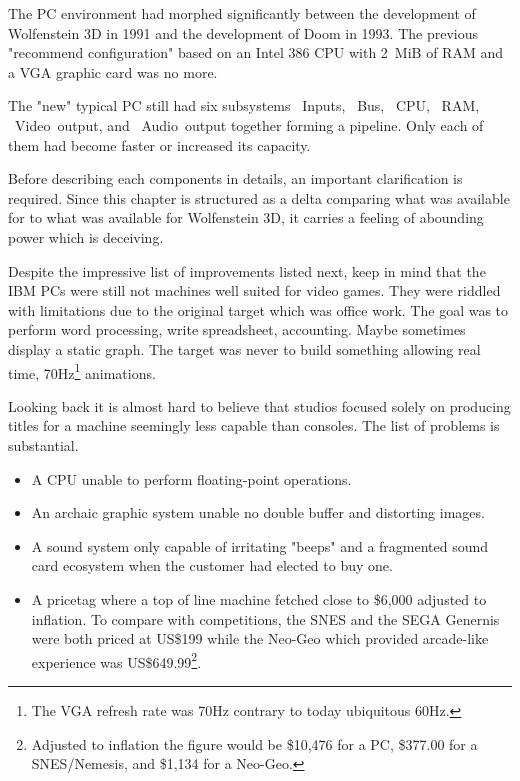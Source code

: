 The PC environment had morphed significantly between the development of Wolfenstein 3D in 1991 and the development of Doom in 1993. The previous "recommend configuration" based on an Intel 386 CPU with 2~MiB of RAM and a VGA graphic card was no more.\\
\par
The "new" typical PC still had six subsystems ~Inputs, ~Bus, ~CPU, ~RAM, ~Video~output, and ~Audio~output together forming a pipeline. Only each of them had become faster or increased its capacity.\\
\par
\vspace{2mm}
\par
 Before describing each components in details, an important clarification is required. Since this chapter is structured as a delta comparing what was available for \doom to what was available for Wolfenstein 3D, it carries a feeling of abounding power which is deceiving. \\
 \par
 Despite the impressive list of improvements listed next, keep in mind that the IBM PCs were still not machines well suited for video games. They were riddled with limitations due to the original target which was office work. The goal was to perform word processing, write spreadsheet, accounting. Maybe sometimes display a static graph. The target was never to build something allowing real time, 70Hz\footnote{The VGA refresh rate was 70Hz contrary to today ubiquitous 60Hz.} animations.\\ 
\par 
Looking back it is almost hard to believe that studios focused solely on producing titles for a machine seemingly less capable than consoles. The list of problems is substantial.
\begin{itemize}
\item A CPU unable to perform floating-point operations.
\item An archaic graphic system unable no double buffer and distorting images.
\item A sound system only capable of irritating "beeps" and a fragmented sound card ecosystem when the customer had elected to buy one.
\item A pricetag where a top of line machine fetched close to \$6,000 adjusted to inflation. To compare with competitions, the SNES and the SEGA Genernis were both priced at US\$199 while the Neo-Geo which provided arcade-like experience was US\$649.99\footnote{Adjusted to inflation the figure would be \$10,476 for a PC, \$377.00 for a SNES/Nemesis, and \$1,134 for a Neo-Geo.}.
\end{itemize}
